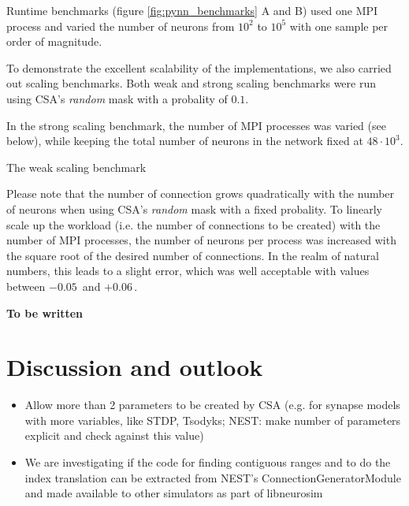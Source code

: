 \documentclass{frontiersSCNS} %
\newcommand{\permil}{\,\textperthousand\xspace}
\newcommand{\tbw}[1]{{\bf\parindent0pt\color{red}#1}}
\begin{document}
Runtime benchmarks (figure \ref{fig:pynn_benchmarks} A and B) used one
MPI process and varied the number of neurons from $10^2$ to $10^5$
with one sample per order of magnitude.

To demonstrate the excellent scalability of the implementations, we
also carried out scaling benchmarks. Both weak and strong scaling
benchmarks were run using CSA's \emph{random} mask with a probality of
$0.1$.

In the strong scaling benchmark, the number of MPI processes was
varied (see below), while keeping the total number of neurons in the
network fixed at $48 \cdot 10^3$.

The weak scaling benchmark

Please note that the number of connection grows quadratically with the
number of neurons when using CSA's \emph{random} mask with a fixed
probality. To linearly scale up the workload (i.e. the number of
connections to be created) with the number of MPI processes, the
number of neurons per process was increased with the square root of
the desired number of connections. In the realm of natural numbers,
this leads to a slight error, which was well acceptable with values
between $-0.05$\permil and $+0.06$\permil.


\tbw{To be written}


\section{Discussion and outlook}

\begin{itemize}
\item Allow more than 2 parameters to be created by CSA (e.g. for
  synapse models with more variables, like STDP, Tsodyks; NEST: make
  number of parameters explicit and check against this value)
\item We are investigating if the code for finding contiguous ranges
  and to do the index translation can be extracted from NEST's
  ConnectionGeneratorModule and made available to other simulators as
  part of libneurosim
\end{itemize}
\end{document}
